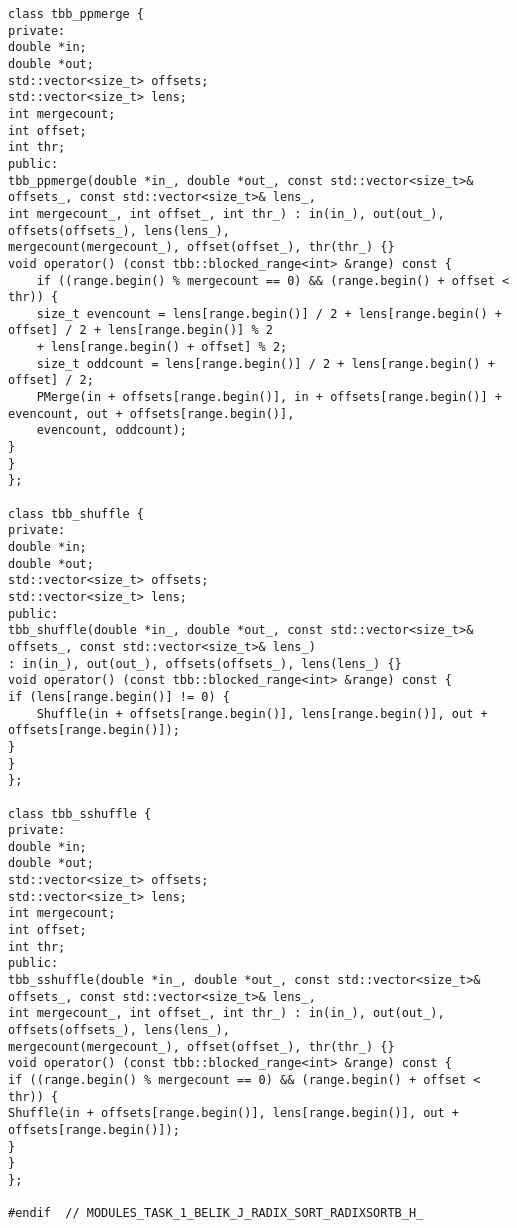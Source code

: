 \documentclass{report}
\begin{document}
\begin{lstlisting}
class tbb_ppmerge {
private:
double *in;
double *out;
std::vector<size_t> offsets;
std::vector<size_t> lens;
int mergecount;
int offset;
int thr;
public:
tbb_ppmerge(double *in_, double *out_, const std::vector<size_t>& offsets_, const std::vector<size_t>& lens_,
int mergecount_, int offset_, int thr_) : in(in_), out(out_), offsets(offsets_), lens(lens_),
mergecount(mergecount_), offset(offset_), thr(thr_) {}
void operator() (const tbb::blocked_range<int> &range) const {
	if ((range.begin() % mergecount == 0) && (range.begin() + offset < thr)) {
	size_t evencount = lens[range.begin()] / 2 + lens[range.begin() + offset] / 2 + lens[range.begin()] % 2
	+ lens[range.begin() + offset] % 2;
	size_t oddcount = lens[range.begin()] / 2 + lens[range.begin() + offset] / 2;
	PMerge(in + offsets[range.begin()], in + offsets[range.begin()] + evencount, out + offsets[range.begin()],
	evencount, oddcount);
}
}
};

class tbb_shuffle {
private:
double *in;
double *out;
std::vector<size_t> offsets;
std::vector<size_t> lens;
public:
tbb_shuffle(double *in_, double *out_, const std::vector<size_t>& offsets_, const std::vector<size_t>& lens_)
: in(in_), out(out_), offsets(offsets_), lens(lens_) {}
void operator() (const tbb::blocked_range<int> &range) const {
if (lens[range.begin()] != 0) {
	Shuffle(in + offsets[range.begin()], lens[range.begin()], out + offsets[range.begin()]);
}
}
};

class tbb_sshuffle {
private:
double *in;
double *out;
std::vector<size_t> offsets;
std::vector<size_t> lens;
int mergecount;
int offset;
int thr;
public:
tbb_sshuffle(double *in_, double *out_, const std::vector<size_t>& offsets_, const std::vector<size_t>& lens_,
int mergecount_, int offset_, int thr_) : in(in_), out(out_), offsets(offsets_), lens(lens_),
mergecount(mergecount_), offset(offset_), thr(thr_) {}
void operator() (const tbb::blocked_range<int> &range) const {
if ((range.begin() % mergecount == 0) && (range.begin() + offset < thr)) {
Shuffle(in + offsets[range.begin()], lens[range.begin()], out + offsets[range.begin()]);
}
}
};

#endif  // MODULES_TASK_1_BELIK_J_RADIX_SORT_RADIXSORTB_H_
\end{lstlisting}
\end{document}
